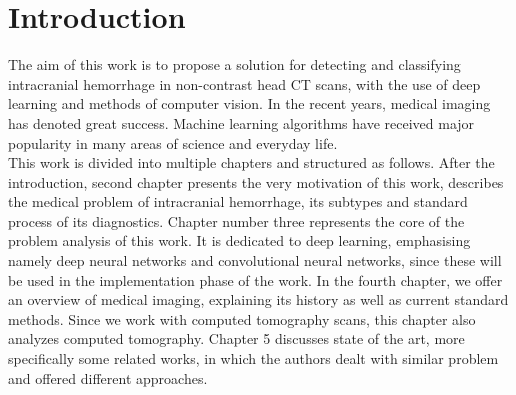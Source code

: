 \chapter{Introduction}

The aim of this work is to propose a solution for detecting and classifying intracranial hemorrhage in non-contrast head CT scans, with the use of deep learning and methods of computer vision. 
In the recent years, medical imaging has denoted great success. Machine learning algorithms have received major popularity in many areas of science and everyday life. 
\\This work is divided into multiple chapters and structured as follows. After the introduction, second chapter presents the very motivation of this work, describes the medical problem of intracranial hemorrhage, its subtypes and standard process of its diagnostics. Chapter number three represents the core of the problem analysis of this work. It is dedicated to deep learning, emphasising namely deep neural networks and convolutional neural networks, since these will be used in the implementation phase of the work. In the fourth chapter, we offer an overview of medical imaging, explaining its history as well as current standard methods. Since we work with computed tomography scans, this chapter also analyzes computed tomography. Chapter 5 discusses state of the art, more specifically some related works, in which the authors dealt with similar problem and offered different approaches.
